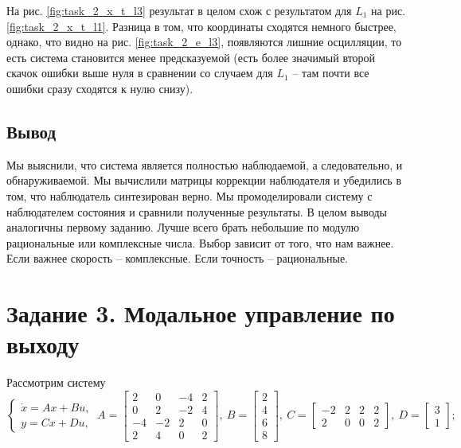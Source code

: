 \documentclass[a4paper, 12pt]{article}
\begin{document}
    На рис. \ref{fig:task_2_x_t_l3} результат в целом схож с результатом для $L_1$ на рис. \ref{fig:task_2_x_t_l1}.
    Разница в том, что координаты сходятся немного быстрее, однако, что видно на рис. \ref{fig:task_2_e_l3}, появляются
    лишние осцилляции, то есть система становится менее предсказуемой (есть более значимый второй скачок ошибки выше нуля
    в сравнении со случаем для $L_1$ -- там почти все ошибки сразу сходятся к нулю снизу).

    
    \subsection{Вывод}
    Мы выяснили, что система является полностью наблюдаемой, а следовательно, и обнаруживаемой.
    Мы вычислили матрицы коррекции наблюдателя и убедились в том, что наблюдатель синтезирован верно.
    Мы промоделировали систему с наблюдателем состояния и сравнили полученные результаты. В целом
    выводы аналогичны первому заданию. Лучше всего брать небольшие по модулю рациональные или комплексные числа.
    Выбор зависит от того, что нам важнее. Если важнее скорость -- комплексные. Если точность -- рациональные.


    \section{Задание 3. Модальное управление по выходу}
    Рассмотрим систему
    $$
    \begin{cases}
        \dot{x}=Ax+Bu,\\
        y=Cx+Du,
    \end{cases}\ A=\begin{bmatrix}
        2 &0 &-4 &2\\
        0 &2 &-2 &4\\
        -4 &-2 &2 &0\\
        2 &4 &0 &2
    \end{bmatrix},\ B=\begin{bmatrix}
        2\\
        4\\
        6\\
        8
    \end{bmatrix},\ C=\begin{bmatrix}
        -2 &2 &2 &2\\
        2 &0 &0 &2
    \end{bmatrix},\ D=\begin{bmatrix}
        3\\
        1
    \end{bmatrix};
    $$
\end{document}
